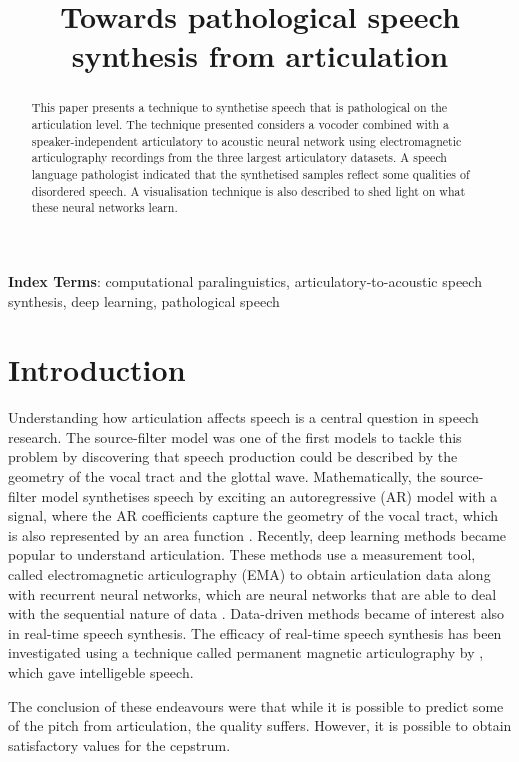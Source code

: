\documentclass[a4paper]{article}
\title{Towards pathological speech synthesis from articulation}
\begin{document}
\maketitle
% 
\begin{abstract}

  This paper presents a technique to synthetise speech that is pathological on the articulation level.
  The technique presented considers a vocoder combined with a speaker-independent articulatory to acoustic neural network using electromagnetic articulography recordings from the three largest articulatory datasets. A speech language pathologist indicated that the synthetised samples reflect some qualities of disordered speech. A visualisation technique is also described to shed light on what these neural networks learn.
\end{abstract}
\noindent\textbf{Index Terms}: computational paralinguistics, articulatory-to-acoustic
speech synthesis, deep learning, pathological speech

\section{Introduction}
Understanding how articulation affects speech is a central question in speech
research. The source-filter model was one of the first models to tackle this
problem by discovering that speech production could be described by
the geometry of the vocal tract and the glottal wave. Mathematically,
the source-filter model synthetises speech by exciting an autoregressive (AR) model with a
signal, where the AR coefficients capture the geometry of the
vocal tract, which is also represented by an area function \cite{Benesty2009} \cite{Fant1981}.
Recently, deep learning methods became popular
to understand articulation. These methods use a measurement tool,
called electromagnetic articulography (EMA) to obtain articulation data 
\cite{Aryal2016} \cite{Taguchi} \cite{Liu2018} along with recurrent
neural networks, which are neural networks that are able to deal with
the sequential nature of data \cite{Hochreiter1997}. Data-driven methods became of interest also
in real-time speech synthesis. The efficacy of real-time speech synthesis
has been investigated using a technique called permanent magnetic articulography
by \cite{Gonzalez2017}, which gave intelligeble
speech.

The conclusion of these endeavours were that while it is possible to
predict some of the pitch from articulation, the quality suffers.
However, it is possible to obtain satisfactory values for the
cepstrum.
\end{document}
